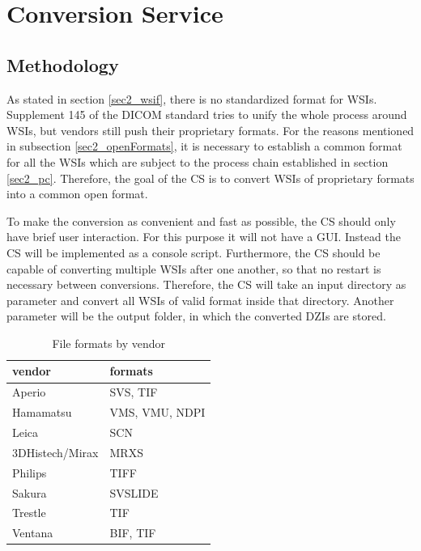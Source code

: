 \chapter{Conversion Service}
\label{sec3_cs}
\section{Methodology}
As stated in section \ref{sec2_wsif}, there is no standardized format for WSIs. Supplement 145 of the DICOM standard tries to unify the whole process around WSIs, but vendors still push their proprietary formats. For the reasons mentioned in subsection \ref{sec2_openFormats}, it is necessary to establish a common format for all the WSIs which are subject to the process chain established in section \ref{sec2_pc}. Therefore, the goal of the CS is to convert WSIs of proprietary formats into a common open format.

To make the conversion as convenient and fast as possible, the CS should only have brief user interaction. For this purpose it will not have a GUI. Instead the CS will be implemented as a console script. Furthermore, the CS should be capable of converting multiple WSIs after one another, so that no restart is necessary between conversions. Therefore, the CS will take an input directory as parameter and convert all WSIs of valid format inside that directory. Another parameter will be the output folder, in which the converted DZIs are stored.

\begin{table}[H]
	\begin{center}
		\begin{tabular}{| l | l |}
			\hline
			\textbf{vendor} & \textbf{formats}\\ \hline
			Aperio & SVS, TIF\\ \hline
			Hamamatsu & VMS, VMU, NDPI\\ \hline
			Leica & SCN\\ \hline
			3DHistech/Mirax & MRXS\\ \hline
			Philips & TIFF\\ \hline
			Sakura & SVSLIDE\\ \hline
			Trestle & TIF\\ \hline
			Ventana & BIF, TIF\\ \hline
		\end{tabular}
		\caption{File formats by vendor}
		\label{tab3_formatsByVendor}
	\end{center}
\end{table}

